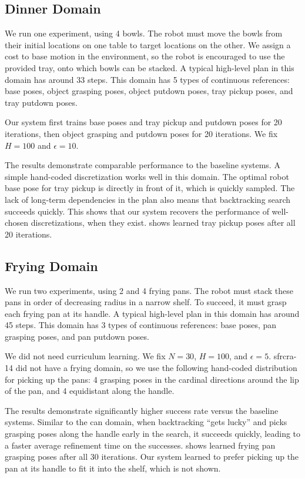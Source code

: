 \subsection{Dinner Domain}
We run one experiment, using 4 bowls. The robot must
move the bowls from their initial locations on one table to target
locations on the other. We assign a cost to base motion in the
environment, so the robot is encouraged to use the provided tray, onto
which bowls can be stacked. A typical high-level plan in this domain has around 33 steps.
This domain has 5 types of continuous
references: base poses, object grasping poses, object putdown poses,
tray pickup poses, and tray putdown poses.

Our system first trains base poses and tray pickup
and putdown poses for 20 iterations, then object grasping and putdown
poses for 20 iterations. We fix $H = 100$ and $\epsilon = 10$.

The results demonstrate comparable performance to the baseline
systems. A simple hand-coded discretization works well in
this domain. The optimal robot base pose for tray pickup
is directly in front of it, which is quickly sampled.
The lack of long-term
dependencies in the plan also means that backtracking search succeeds
quickly. This shows that our system recovers the performance of
well-chosen discretizations, when they exist.  shows learned tray
pickup poses after all 20 iterations.

\subsection{Frying Domain}
We run two experiments, using 2 and 4 frying pans. The robot
must stack these pans in order of decreasing radius in a narrow
shelf. To succeed, it must grasp each frying pan at its handle.
A typical high-level plan in this domain has around 45 steps.
This domain has 3 types of continuous references: base poses,
pan grasping poses, and pan putdown poses.

We did not need curriculum learning. We fix $N = 30$, $H = 100$, and
$\epsilon = 5$. {\sc sfrcra-14} did not have a frying domain, so we
use the following hand-coded distribution for picking up the pans: 4
grasping poses in the cardinal directions around the lip of the pan,
and 4 equidistant along the handle.

The results demonstrate significantly higher success rate versus the
baseline systems. Similar to the can domain, when backtracking ``gets lucky'' and
picks grasping poses along the handle early in the search, it succeeds quickly, leading
to a faster average refinement time on the successes.
 shows learned frying pan grasping poses
after all 30 iterations. Our system learned to prefer picking up the
pan at its handle to fit it into the shelf, which is not shown.






